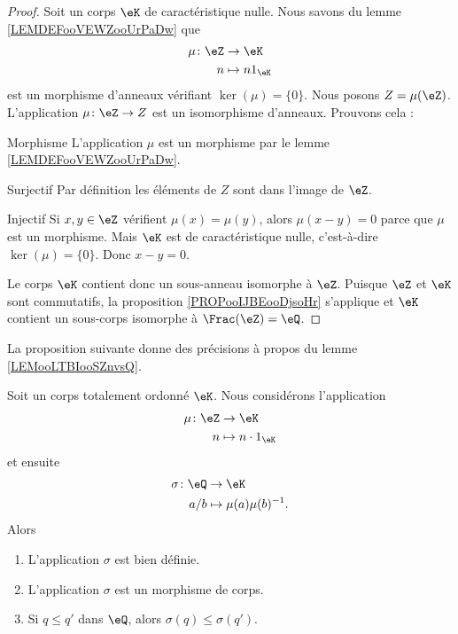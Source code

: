 \begin{proof}
    Soit un corps \( \eK\) de caractéristique nulle. Nous savons du lemme \ref{LEMDEFooVEWZooUrPaDw} que
    \begin{equation}
        \begin{aligned}
            \mu\colon \eZ&\to \eK \\
            n&\mapsto n1_{\eK} 
        \end{aligned}
    \end{equation}
    est un morphisme d'anneaux vérifiant \( \ker(\mu)=\{ 0 \}\). Nous posons \( Z=\mu(\eZ)\). L'application \( \mu\colon \eZ\to Z\) est un isomorphisme d'anneaux. Prouvons cela :
    \begin{subproof}
    \item[Morphisme]
        L'application \( \mu\) est un morphisme par le lemme \ref{LEMDEFooVEWZooUrPaDw}.
    \item[Surjectif]
        Par définition les éléments de \( Z\) sont dans l'image de \( \eZ\).
    \item[Injectif] Si \( x,y\in \eZ\) vérifient \( \mu(x)=\mu(y)\), alors \( \mu(x-y)=0\) parce que \( \mu\) est un morphisme. Mais \( \eK\) est de caractéristique nulle, c'est-à-dire \( \ker(\mu)=\{ 0 \}\). Donc \( x-y=0\).
    \end{subproof}
    Le corps \( \eK\) contient donc un sous-anneau isomorphe à \( \eZ\). Puisque \( \eZ\) et \( \eK\) sont commutatifs, la proposition \ref{PROPooIJBEooDjsoHr} s'applique et \( \eK\) contient un sous-corps isomorphe à \( \Frac(\eZ)=\eQ\).
\end{proof}

La proposition suivante donne des précisions à propos du lemme \ref{LEMooLTBIooSZnvsQ}.

\begin{proposition}      \label{PROPooKNROooFdgIeQ}
    Soit un corps totalement ordonné \( \eK\). Nous considérons l'application
    \begin{equation}
        \begin{aligned}
            \mu\colon \eZ&\to \eK \\
            n&\mapsto n\cdot 1_{\eK} 
        \end{aligned}
    \end{equation}
    et ensuite
    \begin{equation}
        \begin{aligned}
            \sigma\colon \eQ&\to \eK \\
            a/b&\mapsto \mu(a)\mu(b)^{-1}. 
        \end{aligned}
    \end{equation}
    Alors
    \begin{enumerate}
        \item
            L'application \( \sigma\) est bien définie.
        \item
            L'application \( \sigma\) est un morphisme de corps.
        \item
            Si \( q\leq q'\) dans \( \eQ\), alors \( \sigma(q)\leq \sigma(q')\).
    \end{enumerate}
\end{proposition}

